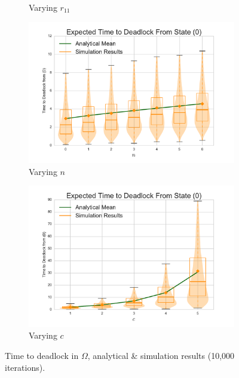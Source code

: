 \documentclass{article}
\begin{document}
\begin{figure}[!htbp]
\begin{subfigure}[b]{0.5\textwidth}
    \caption{Varying $r_{11}$}
    \label{fig:1Nms_r11}
  \end{subfigure}
  \begin{subfigure}[b]{0.5\textwidth}
    \includegraphics[width=\textwidth]{images/varyn_1Nms}
    \caption{Varying $n$}
    \label{fig:1Nms_n}
  \end{subfigure}
  \begin{center}
  \begin{subfigure}[b]{0.5\textwidth}
    \includegraphics[width=\textwidth]{images/varyc_1Nms}
    \caption{Varying $c$}
    \label{fig:1Nms_c}
  \end{subfigure}
  \end{center}
  \caption{Time to deadlock in $\Omega$, analytical \& simulation results (10,000 iterations).}
  \label{fig:timestodeadlock1nodemultiserver}
\end{figure}
\end{document}
